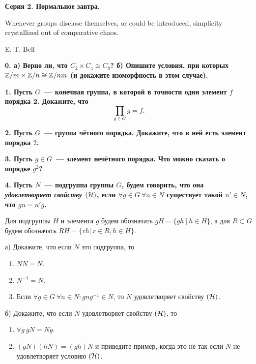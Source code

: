 \documentclass[12pt]{article}
\begin{document}
	
	\centerline{\bf{Серия 2. Нормальное завтра. }}

	\epigraph{Whenever groups disclose themselves, or could be introduced, simplicity crystallized out of comparative chaos.}{E. T. Bell}


	\bf{0.} а) Верно ли, что $C_{2} \times C_{4} \cong C_{8}$? б) Опишите условия, при которых  $\mathbb{Z}/m \times \mathbb{Z}/n \cong \mathbb{Z}/nm$ (и докажите изоморфность в этом случае). 


	\bf{1.} Пусть $G$~--- конечная группа, в которой в точности один элемент $f$ порядка 2. Докажите, что 
	\[
		\prod_{g \in G} g = f.
	\]

	\bf{2.} Пусть $G$~--- группа чётного порядка. Докажите, что в ней есть элемент порядка $2$. 

	\bf{3.} Пусть $g \in G$~--- элемент нечётного порядка. Что можно сказать о порядке $g^2$?

	 \bf{4.}  Пусть $N$~--- подгруппа группы $G$, будем говорить, что она \emph{удовлетворяет свойству $(\mathcal{H})$}, если $\forall g \in G \ \forall n \in N$ существует такой $n' \in N$, что $gn = n'g$.

	Для подгруппы $H$ и элемента $g$ будем обозначать $g H = \{ gh \ \vert \ h \in H \}$, а для $R \subset G$ будем обозначать $RH = \{ r h \vert \ r \in R, h \in H \}$.

	а) Докажите, что если $N$ это подгруппа, то
	\vspace{-2mm}
	\begin{enumerate}
		\item $NN = N$. 
		\item $N^{-1} = N$. 
		\item Если $\forall g\in G\  \forall n \in N\colon g n g^{-1} \in N$, то $N$ удовлетворяет свойству $(\mathcal{H})$.
	\end{enumerate}

	б) Докажите, что если $N$ удовлетворяет свойству $(\mathcal{H})$, то
	\vspace{-2mm}
	\begin{enumerate}
		\item $\forall g \ gN = Ng$.
		\item $(gN)(hN) = (gh)N$ и приведите пример, когда это не так если $N$ не удовлетворяет условию $(\mathcal{H})$.
	\end{enumerate}
\end{document}
